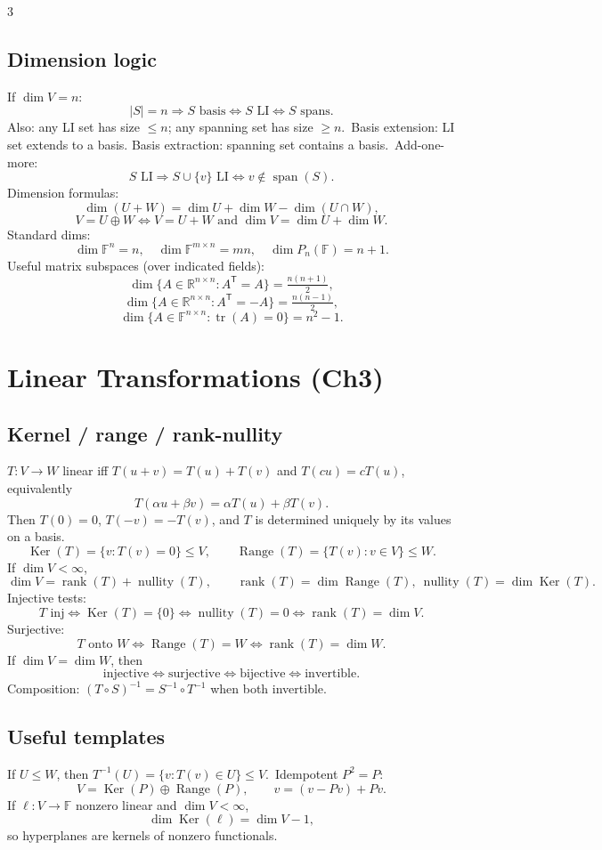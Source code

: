\documentclass[10pt]{article}
\newcommand{\R}{\mathbb{R}}
\newcommand{\F}{\mathbb{F}}
\newcommand{\rank}{\operatorname{rank}}
\newcommand{\nullity}{\operatorname{nullity}}
\newcommand{\Ker}{\operatorname{Ker}}
\newcommand{\Range}{\operatorname{Range}}
\newcommand{\spann}{\operatorname{span}}
\newcommand{\tr}{\operatorname{tr}}
\begin{document}
\begin{multicols}{3}
\subsection*{Dimension logic}
If $\dim V=n$:
\[
|S|=n\Rightarrow S\text{ basis}\iff S\text{ LI}\iff S\text{ spans}.
\]
Also: any LI set has size $\le n$; any spanning set has size $\ge n$.\
Basis extension: LI set extends to a basis. Basis extraction: spanning set contains a basis.\
Add-one-more:
\[
S\text{ LI}\Rightarrow S\cup\{v\}\text{ LI}\iff v\notin\spann(S).
\]
Dimension formulas:
\[
\dim(U+W)=\dim U+\dim W-\dim(U\cap W),
\]
\[
V=U\oplus W\iff V=U+W\text{ and }\dim V=\dim U+\dim W.
\]
Standard dims:
\[
\dim\F^n=n,\quad \dim\F^{m\times n}=mn,\quad \dim P_n(\F)=n+1.
\]
Useful matrix subspaces (over indicated fields):
\[
\dim\{A\in\R^{n\times n}:A^{\mathsf T}=A\}=\tfrac{n(n+1)}2,
\]
\[
\dim\{A\in\R^{n\times n}:A^{\mathsf T}=-A\}=\tfrac{n(n-1)}2,
\]
\[
\dim\{A\in\F^{n\times n}:\tr(A)=0\}=n^2-1.
\]

\section*{Linear Transformations (Ch3)}

\subsection*{Kernel / range / rank-nullity}
$T:V\to W$ linear iff $T(u+v)=T(u)+T(v)$ and $T(cu)=cT(u)$, equivalently
\[
T(\alpha u+\beta v)=\alpha T(u)+\beta T(v).
\]
Then $T(0)=0$, $T(-v)=-T(v)$, and $T$ is determined uniquely by its values on a basis.\
\[
\Ker(T)=\{v:T(v)=0\}\le V,\qquad \Range(T)=\{T(v):v\in V\}\le W.
\]
If $\dim V<\infty$,
\[
\dim V=\rank(T)+\nullity(T),\qquad \rank(T)=\dim\Range(T),\ \nullity(T)=\dim\Ker(T).
\]
Injective tests:
\[
T\text{ inj}\iff \Ker(T)=\{0\}\iff \nullity(T)=0\iff \rank(T)=\dim V.
\]
Surjective:
\[
T\text{ onto }W\iff \Range(T)=W\iff \rank(T)=\dim W.
\]
If $\dim V=\dim W$, then
\[
\text{injective}\iff \text{surjective}\iff \text{bijective}\iff \text{invertible}.
\]
Composition: $(T\circ S)^{-1}=S^{-1}\circ T^{-1}$ when both invertible.

\subsection*{Useful templates}
If $U\le W$, then $T^{-1}(U)=\{v:T(v)\in U\}\le V$.\
Idempotent $P^2=P$:
\[
V=\Ker(P)\oplus\Range(P),\qquad v=(v-Pv)+Pv.
\]
If $\ell:V\to\F$ nonzero linear and $\dim V<\infty$,
\[
\dim\Ker(\ell)=\dim V-1,
\]
so hyperplanes are kernels of nonzero functionals.


\end{multicols}
\end{document}
